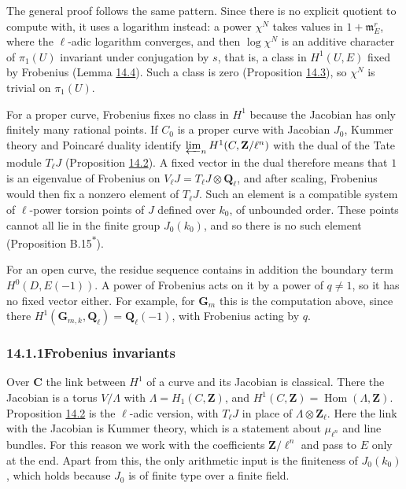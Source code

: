 \documentclass[11pt]{article}
\newcommand{\bpout}[1]{#1\textsuperscript{\hyperlink{bp-outside}{\ensuremath{\ast}}}}
\providecommand{\Hom}{}\renewcommand{\Hom}{\operatorname{Hom}}
\begin{document}
The general proof follows the same pattern. Since there is no explicit quotient to compute with, it uses a logarithm instead: a power \(\chi^N\) takes values in \(1+\mathfrak m_E^r\), where the \(\ell\)-adic logarithm converges, and then \(\log\chi^N\) is an additive character of \(\pi_1(U)\) invariant under conjugation by \(s\), that is, a class in \(H^1(U,E)\) fixed by Frobenius (Lemma \hyperref[bp17]{14.4}). Such a class is zero (Proposition \hyperref[bp13]{14.3}), so \(\chi^N\) is trivial on \(\pi_1(U)\).

For a proper curve, Frobenius fixes no class in \(H^1\) because the Jacobian has only finitely many rational points. If \(C_0\) is a proper curve with Jacobian \(J_0\), Kummer theory and Poincaré duality identify \(\varprojlim_nH^1(C,\mathbf Z/\ell^n)\) with the dual of the Tate module \(T_\ell J\) (Proposition \hyperref[bp10]{14.2}). A fixed vector in the dual therefore means that \(1\) is an eigenvalue of Frobenius on \(V_\ell J=T_\ell J\otimes\mathbf Q_\ell\), and after scaling, Frobenius would then fix a nonzero element of \(T_\ell J\). Such an element is a compatible system of \(\ell\)-power torsion points of \(J\) defined over \(k_0\), of unbounded order. These points cannot all lie in the finite group \(J_0(k_0)\), and so there is no such element (Proposition \bpout{B.15}).

For an open curve, the residue sequence contains in addition the boundary term \(H^0(D,E(-1))\). A power of Frobenius acts on it by a power of \(q\ne1\), so it has no fixed vector either. For example, for \(\mathbf G_m\) this is the computation above, since there \(H^1(\mathbf G_{m,k},\mathbf Q_\ell)=\mathbf Q_\ell(-1)\), with Frobenius acting by \(q\).

\subsubsection*{\texorpdfstring{14.1.1\quad Frobenius invariants}{14.1.1 Frobenius invariants}}
\label{bp5}%
\label{bp6}%
Over \(\mathbf C\) the link between \(H^1\) of a curve and its Jacobian is classical. There the Jacobian is a torus \(V/\Lambda\) with \(\Lambda=H_1(C,\mathbf Z)\), and \(H^1(C,\mathbf Z)=\Hom(\Lambda,\mathbf Z)\). Proposition \hyperref[bp10]{14.2} is the \(\ell\)-adic version, with \(T_\ell J\) in place of \(\Lambda\otimes\mathbf Z_\ell\). Here the link with the Jacobian is Kummer theory, which is a statement about \(\mu_{\ell^n}\) and line bundles. For this reason we work with the coefficients \(\mathbf Z/\ell^n\) and pass to \(E\) only at the end. Apart from this, the only arithmetic input is the finiteness of \(J_0(k_0)\), which holds because \(J_0\) is of finite type over a finite field.
\end{document}
